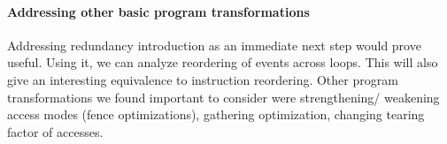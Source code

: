     \paragraph{Addressing other basic program transformations}
        Addressing redundancy introduction as an immediate next step would prove useful.
        Using it, we can analyze reordering of events across loops. 
        This will also give an interesting equivalence to instruction reordering. 
        Other program transformations we found important to consider were strengthening/ weakening access modes (fence optimizations), gathering optimization, changing tearing factor of accesses. 
    
    